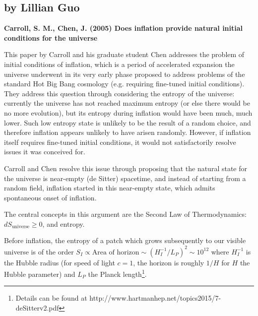 \subsection{by Lillian Guo}
\textbf{Carroll, S. M., Chen, J. (2005) Does inflation provide natural initial conditions for the universe}

This paper by Carroll and his graduate student Chen \cite{Carroll2005} addresses the problem of initial conditions of inflation, which is a period of accelerated expansion the universe underwent in its very early phase proposed to address problems of the standard Hot Big Bang cosmology (e.g. requiring fine-tuned initial conditions). They address this question through considering the entropy of the universe: currently the universe has not reached maximum entropy (or else there would be no more evolution), but its entropy during inflation would have been much, much lower. Such low entropy state is unlikely to be the result of a random choice, and therefore inflation appears unlikely to have arisen randomly. However, if inflation itself requires fine-tuned initial conditions, it would not satisfactorily resolve issues it was conceived for.\par 

Carroll and Chen resolve this issue through proposing that the natural state for the universe is near-empty (de Sitter) spacetime, and instead of starting from a random field, inflation started in this near-empty state, which admits spontaneous onset of inflation. \par 

The central concepts in this argument are the Second Law of Thermodynamics: $dS_\mathrm{universe} \geq 0$, and entropy.\par 

Before inflation, the entropy of a patch which grows subsequently to our visible universe is of the order $S_I \propto \text{Area of horizon} \sim (H_I^{-1}/L_P)^2 \sim 10^{12}$ where $H_I^{-1}$ is the Hubble radius (for speed of light $c=1$, the horizon is roughly $1/H$ for $H$ the Hubble parameter) and $L_P$ the Planck length\footnote{Details can be found at http://www.hartmanhep.net/topics2015/7-deSitterv2.pdf}.\par 

